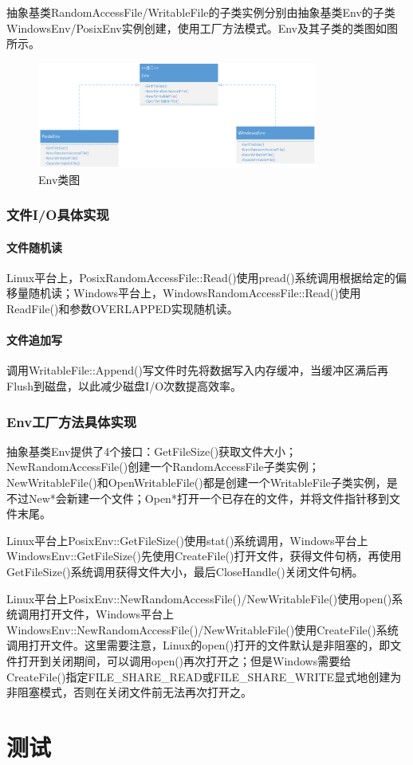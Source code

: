 \documentclass[bachelor]{thesis-uestc}
\begin{document}
抽象基类RandomAccessFile/WritableFile的子类实例分别由抽象基类Env的子类WindowsEnv/PosixEnv实例创建，使用工厂方法模式。Env及其子类的类图如图所示。

\begin{figure}[htbp]
	\centering\includegraphics[height=3.5cm]{images/env.png}
	\caption{Env类图}
	\label{fig:env}
\end{figure}

\subsection{文件I/O具体实现}
\subsubsection{文件随机读}
Linux平台上，PosixRandomAccessFile::Read()使用pread()系统调用根据给定的偏移量随机读；Windows平台上，WindowsRandomAccessFile::Read()使用ReadFile()和参数OVERLAPPED实现随机读。

\subsubsection{文件追加写}
调用WritableFile::Append()写文件时先将数据写入内存缓冲，当缓冲区满后再Flush到磁盘，以此减少磁盘I/O次数提高效率。

\subsection{Env工厂方法具体实现}
抽象基类Env提供了4个接口：GetFileSize()获取文件大小；NewRandomAccessFile()创建一个RandomAccessFile子类实例；NewWritableFile()和OpenWritableFile()都是创建一个WritableFile子类实例，是不过New*会新建一个文件；Open*打开一个已存在的文件，并将文件指针移到文件末尾。\par
Linux平台上PosixEnv::GetFileSize()使用stat()系统调用，Windows平台上WindowsEnv::GetFileSize()先使用CreateFile()打开文件，获得文件句柄，再使用GetFileSize()系统调用获得文件大小，最后CloseHandle()关闭文件句柄。\par
Linux平台上PosixEnv::NewRandomAccessFile()/NewWritableFile()使用open()系统调用打开文件，Windows平台上WindowsEnv::NewRandomAccessFile()/NewWritableFile()使用CreateFile()系统调用打开文件。这里需要注意，Linux的open()打开的文件默认是非阻塞的，即文件打开到关闭期间，可以调用open()再次打开之；但是Windows需要给CreateFile()指定FILE\_SHARE\_READ或FILE\_SHARE\_WRITE显式地创建为非阻塞模式，否则在关闭文件前无法再次打开之。

\chapter{测试}
\end{document}
